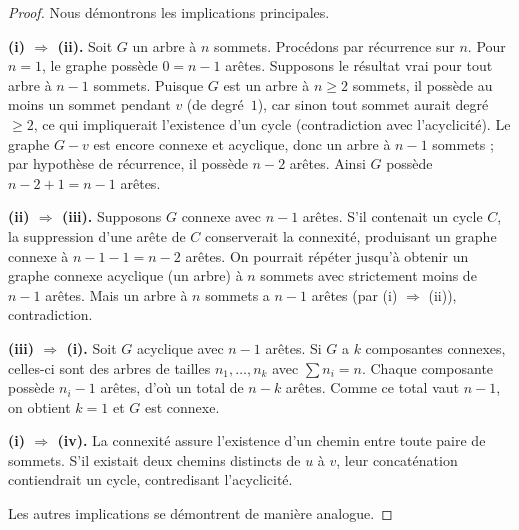 \documentclass[12pt,a4paper,openany]{book}
\theoremstyle{definition}
\theoremstyle{plain}
\theoremstyle{remark}
\begin{document}
\begin{proof}
Nous démontrons les implications principales.

\medskip\noindent
\textbf{(i) $\Rightarrow$ (ii).}\;
Soit $G$ un arbre à $n$ sommets. Procédons par récurrence sur $n$.
Pour $n=1$, le graphe possède $0 = n-1$ arêtes. Supposons le résultat
vrai pour tout arbre à $n-1$ sommets. Puisque $G$ est un arbre à $n\geq 2$
sommets, il possède au moins un sommet pendant $v$ (de degré~$1$), car
sinon tout sommet aurait degré $\geq 2$, ce qui impliquerait l'existence
d'un cycle (contradiction avec l'acyclicité). Le graphe $G - v$ est encore
connexe et acyclique, donc un arbre à $n-1$ sommets ; par hypothèse de
récurrence, il possède $n-2$ arêtes. Ainsi $G$ possède $n-2+1 = n-1$ arêtes.

\medskip\noindent
\textbf{(ii) $\Rightarrow$ (iii).}\;
Supposons $G$ connexe avec $n-1$ arêtes. S'il contenait un cycle $C$, la
suppression d'une arête de $C$ conserverait la connexité, produisant un
graphe connexe à $n-1-1 = n-2$ arêtes. On pourrait répéter jusqu'à obtenir
un graphe connexe acyclique (un arbre) à $n$ sommets avec strictement moins
de $n-1$ arêtes. Mais un arbre à $n$ sommets a $n-1$ arêtes (par (i)
$\Rightarrow$ (ii)), contradiction.

\medskip\noindent
\textbf{(iii) $\Rightarrow$ (i).}\;
Soit $G$ acyclique avec $n-1$ arêtes. Si $G$ a $k$ composantes connexes,
celles-ci sont des arbres de tailles $n_1,\dots,n_k$ avec $\sum n_i = n$.
Chaque composante possède $n_i - 1$ arêtes, d'où un total de $n - k$
arêtes. Comme ce total vaut $n-1$, on obtient $k=1$ et $G$ est connexe.

\medskip\noindent
\textbf{(i) $\Rightarrow$ (iv).}\;
La connexité assure l'existence d'un chemin entre toute paire de sommets.
S'il existait deux chemins distincts de $u$ à $v$, leur concaténation
contiendrait un cycle, contredisant l'acyclicité.

\medskip
Les autres implications se démontrent de manière analogue.
\end{proof}
\end{document}
